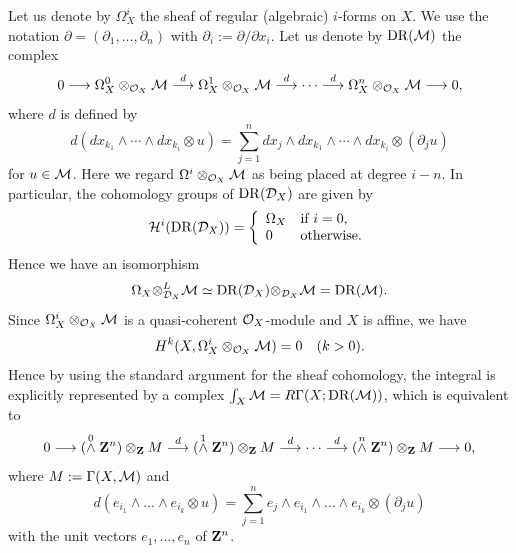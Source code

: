 \documentclass[12pt]{article}
\def\Z{ {\bf Z} }
\def\Dsc{ {\cal D} }
\def\Hsc{ {\cal H} }
\def\Msc{ {\cal M} }
\def\Osc{ {\cal O} }
\begin{document}
Let us denote by $\Omega_X^{i}$ the sheaf of regular (algebraic)
$i$-forms on $X$.  We use the notation 
$\partial = (\partial_1,\dots,\partial_n)$ with 
$\partial_i := \partial/\partial x_i$.  
Let us denote by ${\rm DR}(\Msc)$ the complex
$$
0 \longrightarrow \Omega_X^{0}\otimes_{\Osc_X}\Msc 
\stackrel{d}{\longrightarrow} \Omega_X^{1}\otimes_{\Osc_X}\Msc 
\stackrel{d}{\longrightarrow}
\cdots
\stackrel{d}{\longrightarrow} \Omega_X^{n}\otimes_{\Osc_X}\Msc 
\longrightarrow 0, 
$$
where $d$ is defined by
$$
d(dx_{k_1}\wedge \cdots \wedge dx_{k_i}\otimes u)
= \sum_{j=1}^n dx_j\wedge dx_{k_1}\wedge \cdots \wedge dx_{k_i}
\otimes (\partial_j u)
$$
for $u \in \Msc$.  Here we regard $\Omega^{i}\otimes_{\Osc_X}\Msc$ as
being placed at degree $i-n$.  
In particular, the cohomology groups of ${\rm DR}(\Dsc_X)$ are given by
$$
\Hsc^i({\rm DR}(\Dsc_X)) = \left\{\begin{array}{ll}
\Omega_X & \mbox{if $i=0$,}\\
0        & \mbox{otherwise.}\end{array}\right.
$$
Hence we have an isomorphism 
$$ 
\Omega_X {\otimes}_{\Dsc_X}^{L} \Msc 
\simeq {\rm DR}(\Dsc_X){\otimes}_{\Dsc_X}\Msc 
= {\rm DR}(\Msc).
$$
Since $\Omega_X^{i}\otimes_{\Osc_X}\Msc$ is a quasi-coherent $\Osc_X$-module
and $X$ is affine, we have 
$$
H^k(X,\Omega_X^{i}\otimes_{\Osc_X}\Msc) = 0 \quad (k > 0).
$$
Hence by using the standard argument for the sheaf cohomology, 
the integral is explicitly represented by a complex
$\int_X \Msc = R \Gamma(X; {\rm DR}(\Msc))$, which is equivalent to 
\begin{equation} \label{equation:deRham1}
0 \longrightarrow (\stackrel{0}{\wedge}\Z^n)\otimes_\Z M 
\stackrel{d}{\longrightarrow} (\stackrel{1}{\wedge}\Z^n) \otimes_\Z M
\stackrel{d}{\longrightarrow}
\cdots
\stackrel{d}{\longrightarrow}  (\stackrel{n}{\wedge}\Z^n) \otimes_\Z M
\longrightarrow 0, 
\end{equation}
where $M := \Gamma(X,\Msc)$ and 
$$
d(e_{i_1}\wedge\dots\wedge e_{i_k}\otimes u) = 
\sum_{j=1}^n e_j\wedge e_{i_1}\wedge\dots\wedge e_{i_k}\otimes (\partial_ju)
$$
with the unit vectors $e_1,\dots,e_n$ of $\Z^n$.
\end{document}
